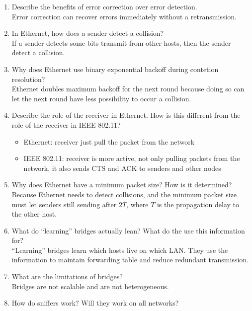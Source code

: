 \documentclass[10pt, a4paper]{article}
\begin{document}
\begin{enumerate}
    \color{black}
\item\mbox{}Describe the benefits of error correction over error detection.\\
    \color{blue}
    Error correction can recover errors immediately without a retransmission.
    \color{black}
\item\mbox{}In Ethernet, how does a sender detect a collision?\\
    \color{blue}
    If a sender detects some bits transmit from other hosts, then the sender detect a collision.
    \color{black}
\item\mbox{} Why does Ethernet use binary exponential backoff during contetion resolution?\\
    \color{blue}
    Ethernet doubles maximum backoff for the next round because doing so can let the next round have less possibility to occur a collision.
    \color{black}
\item\mbox{}Describe the role of the receiver in Ethernet. How is this different from the role of the receiver in IEEE 802.11?
    \color{blue}
        \begin{itemize}
        \item Ethernet: receiver just pull the packet from the network
        \item IEEE 802.11: receiver is more active, not only pulling packets from the network, it also sends CTS and ACK to senders and other nodes
        \end{itemize}
    \color{black}
\item\mbox{}Why does Ethernet have a minimum packet size? How is it determined?\\
    \color{blue}
    Because Ethernet needs to detect collisions, and the minimum packet size must let senders still sending after $2T$, where $T$ is the propagation delay to the other host.
    \color{black}
\item\mbox{}What do ``learning'' bridges actually lean? What do the use this information for?\\
    \color{blue}
    ``Learning'' bridges learn which hosts live on which LAN. They use the information to maintain forwarding table and reduce redundant transmission.
    \color{black}
\item\mbox{}What are the limitations of bridges?\\
    \color{blue}
    Bridges are not scalable and are not heterogeneous.
    \color{black}
\item\mbox{}How do sniffers work? Will they work on all networks?\\

\end{enumerate}
\end{document}
